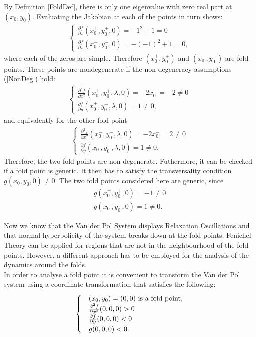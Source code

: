 By Definition \ref{FoldDef}, there is only one eigenvalue with zero real part at $(x_0,y_0)$. Evaluating the Jakobian at each of the points in turn shows:
\begin{align*}
\begin{cases}
 \frac{ \partial f}{\partial x}(x_0^+,y_0^+,0) = -1^2 + 1 =0 \\
 \frac{ \partial f}{\partial x}(x_0^-,y_0^-,0) = -(-1)^2 + 1 =0,
\end{cases}
\end{align*}
where each of the zeros are simple.
Therefore $(x_0^+,y_0^+)$ and $(x_0^-,y_0^-)$ are fold points.
These points are nondegenerate if the non-degeneracy assumptions (\ref{NonDeg}) hold:
\begin{align*}
\begin{cases}
\frac{ \partial ^2 f}{ \partial x^2} (x_0^+,y_0^+, \lambda, 0) = -2 x_0^+ = -2 \neq 0 \\
\frac{\partial f}{\partial y}(x_0^+,y_0^+, \lambda, 0) = 1 \neq 0,
\end{cases}
\end{align*}
and equivalently for the other fold point
\begin{align*}
\begin{cases}
\frac{ \partial ^2 f}{ \partial x^2} (x_0^-,y_0^-, \lambda, 0) = -2 x_0^- = 2 \neq 0 \\
\frac{\partial f}{\partial y}(x_0^-,y_0^-, \lambda, 0) = 1 \neq 0.
\end{cases}
\end{align*}
Therefore, the two fold points are non-degenerate.
Futhermore, it can be checked if a fold point is generic. It then has to satisfy the transversality condition $g(x_0,y_0,0) \neq 0$.
The two fold points considered here are generic, since 
\begin{align*}
 g(x_0^+,y_0^+,0)= -1 \neq 0 \\
g(x_0^-,y_0^-,0)= 1 \neq 0.
\end{align*}

Now we know that the Van der Pol System displays Relaxation Oscillations and that normal hyperbolicity of the system breaks down at the fold points. Fenichel Theory can be applied for regions that are not in the neighbourhood of the fold points. However, a different approach has to be employed for the analysis of the dynamics around the folds.\\


In order to analyse a fold point it is convenient to transform the Van der Pol system using a coordinate transformation that satisfies the following: 
\begin{equation} \label{FoldConditions}
    \begin{cases}
        &\folds=(0,0) \textrm{ is a fold point,}\\
        &\pd{^2f}{x^2}(0,0,0)>0\\
        &\pd{f}{y}(0,0,0)<0\\
        & g(0,0,0) <0.
    \end{cases} 
\end{equation}

